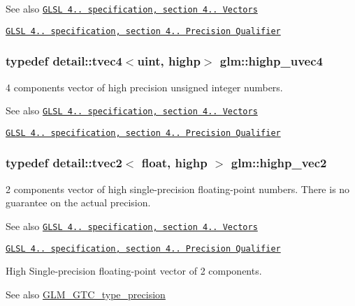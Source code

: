 \begin{DoxySeeAlso}{See also}
\href{http://www.opengl.org/registry/doc/GLSLangSpec.4.20.8.pdf}{\tt G\+L\+SL 4.. specification, section 4.. Vectors} 

\href{http://www.opengl.org/registry/doc/GLSLangSpec.4.20.8.pdf}{\tt G\+L\+SL 4.. specification, section 4.. Precision Qualifier} 
\end{DoxySeeAlso}
\subsubsection[{\texorpdfstring{highp\+\_\+uvec4}{highp_uvec4}}]{\setlength{\rightskip}{0pt plus 5cm}typedef detail\+::tvec4$<$uint, highp$>$ {\bf glm\+::highp\+\_\+uvec4}}\hypertarget{group__core__precision_ga7cb8cc501f7e680e1889b93eb80e6c46}{}\label{group__core__precision_ga7cb8cc501f7e680e1889b93eb80e6c46}
4 components vector of high precision unsigned integer numbers.

\begin{DoxySeeAlso}{See also}
\href{http://www.opengl.org/registry/doc/GLSLangSpec.4.20.8.pdf}{\tt G\+L\+SL 4.. specification, section 4.. Vectors} 

\href{http://www.opengl.org/registry/doc/GLSLangSpec.4.20.8.pdf}{\tt G\+L\+SL 4.. specification, section 4.. Precision Qualifier} 
\end{DoxySeeAlso}
\subsubsection[{\texorpdfstring{highp\+\_\+vec2}{highp_vec2}}]{\setlength{\rightskip}{0pt plus 5cm}typedef detail\+::tvec2$<$ float, highp $>$ {\bf glm\+::highp\+\_\+vec2}}\hypertarget{group__core__precision_ga37645abcfcc1278567e99f1ca492bfbb}{}\label{group__core__precision_ga37645abcfcc1278567e99f1ca492bfbb}
2 components vector of high single-\/precision floating-\/point numbers. There is no guarantee on the actual precision.

\begin{DoxySeeAlso}{See also}
\href{http://www.opengl.org/registry/doc/GLSLangSpec.4.20.8.pdf}{\tt G\+L\+SL 4.. specification, section 4.. Vectors} 

\href{http://www.opengl.org/registry/doc/GLSLangSpec.4.20.8.pdf}{\tt G\+L\+SL 4.. specification, section 4.. Precision Qualifier}
\end{DoxySeeAlso}
High Single-\/precision floating-\/point vector of 2 components. \begin{DoxySeeAlso}{See also}
\hyperlink{group__gtc__type__precision}{G\+L\+M\+\_\+\+G\+T\+C\+\_\+type\+\_\+precision} 
\end{DoxySeeAlso}
